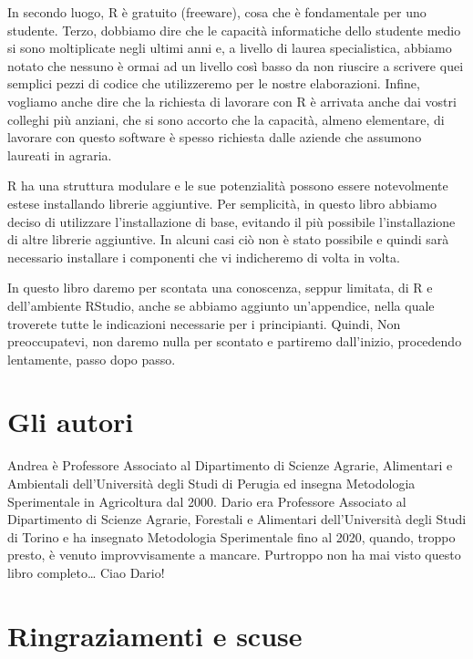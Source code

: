 \documentclass[
  12pt,
]{book}
\begin{document}
In secondo luogo, R è gratuito (freeware), cosa che è fondamentale per uno studente. Terzo, dobbiamo dire che le capacità informatiche dello studente medio si sono moltiplicate negli ultimi anni e, a livello di laurea specialistica, abbiamo notato che nessuno è ormai ad un livello così basso da non riuscire a scrivere quei semplici pezzi di codice che utilizzeremo per le nostre elaborazioni. Infine, vogliamo anche dire che la richiesta di lavorare con R è arrivata anche dai vostri colleghi più anziani, che si sono accorto che la capacità, almeno elementare, di lavorare con questo software è spesso richiesta dalle aziende che assumono laureati in agraria.

R ha una struttura modulare e le sue potenzialità possono essere notevolmente estese installando librerie aggiuntive. Per semplicità, in questo libro abbiamo deciso di utilizzare l'installazione di base, evitando il più possibile l'installazione di altre librerie aggiuntive. In alcuni casi ciò non è stato possibile e quindi sarà necessario installare i componenti che vi indicheremo di volta in volta.

In questo libro daremo per scontata una conoscenza, seppur limitata, di R e dell'ambiente RStudio, anche se abbiamo aggiunto un'appendice, nella quale troverete tutte le indicazioni necessarie per i principianti. Quindi, Non preoccupatevi, non daremo nulla per scontato e partiremo dall'inizio, procedendo lentamente, passo dopo passo.

\hypertarget{gli-autori}{%
\section*{Gli autori}\label{gli-autori}}

Andrea è Professore Associato al Dipartimento di Scienze Agrarie, Alimentari e Ambientali dell'Università degli Studi di Perugia ed insegna Metodologia Sperimentale in Agricoltura dal 2000. Dario era Professore Associato al Dipartimento di Scienze Agrarie, Forestali e Alimentari dell'Università degli Studi di Torino e ha insegnato Metodologia Sperimentale fino al 2020, quando, troppo presto, è venuto improvvisamente a mancare. Purtroppo non ha mai visto questo libro completo\ldots{} Ciao Dario!

\hypertarget{ringraziamenti-e-scuse}{%
\section*{Ringraziamenti e scuse}\label{ringraziamenti-e-scuse}}
\end{document}
